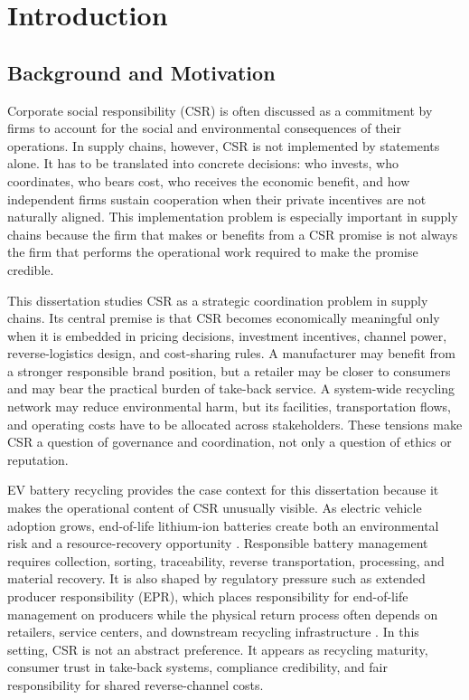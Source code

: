 \chapter{Introduction}
\label{chap:introduction}

\section{Background and Motivation}
\label{sec:intro_background}

Corporate social responsibility (CSR) is often discussed as a commitment by firms to account for the social and environmental consequences of their operations. In supply chains, however, CSR is not implemented by statements alone. It has to be translated into concrete decisions: who invests, who coordinates, who bears cost, who receives the economic benefit, and how independent firms sustain cooperation when their private incentives are not naturally aligned. This implementation problem is especially important in supply chains because the firm that makes or benefits from a CSR promise is not always the firm that performs the operational work required to make the promise credible.

This dissertation studies CSR as a strategic coordination problem in supply chains. Its central premise is that CSR becomes economically meaningful only when it is embedded in pricing decisions, investment incentives, channel power, reverse-logistics design, and cost-sharing rules. A manufacturer may benefit from a stronger responsible brand position, but a retailer may be closer to consumers and may bear the practical burden of take-back service. A system-wide recycling network may reduce environmental harm, but its facilities, transportation flows, and operating costs have to be allocated across stakeholders. These tensions make CSR a question of governance and coordination, not only a question of ethics or reputation.

EV battery recycling provides the case context for this dissertation because it makes the operational content of CSR unusually visible. As electric vehicle adoption grows, end-of-life lithium-ion batteries create both an environmental risk and a resource-recovery opportunity \citep{Harper2019, HoarauLorang2022}. Responsible battery management requires collection, sorting, traceability, reverse transportation, processing, and material recovery. It is also shaped by regulatory pressure such as extended producer responsibility (EPR), which places responsibility for end-of-life management on producers while the physical return process often depends on retailers, service centers, and downstream recycling infrastructure \citep{yang2025bridging, Gu2021, ZhangW2024}. In this setting, CSR is not an abstract preference. It appears as recycling maturity, consumer trust in take-back systems, compliance credibility, and fair responsibility for shared reverse-channel costs.

